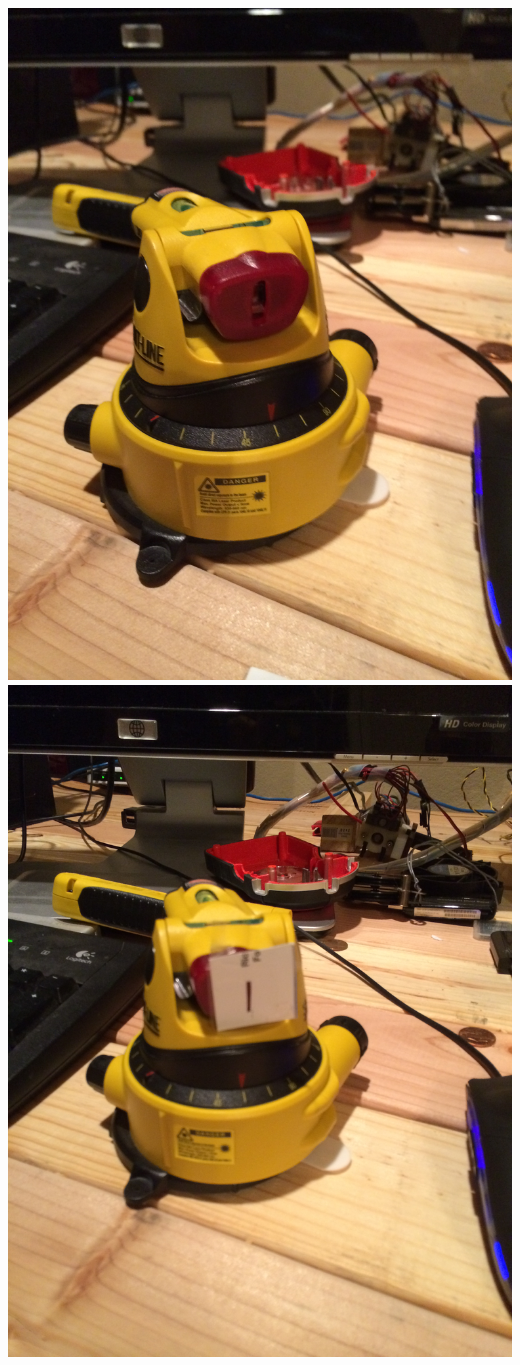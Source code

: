\documentclass[12pt]{article}
\begin{document}
\includegraphics[scale=0.1,angle=270]{images/volume_analysis_setup/IMG_0616.JPG}
\newpage
\includegraphics[scale=0.1,angle=270]{images/volume_analysis_setup/IMG_0617.JPG}
\end{document}
